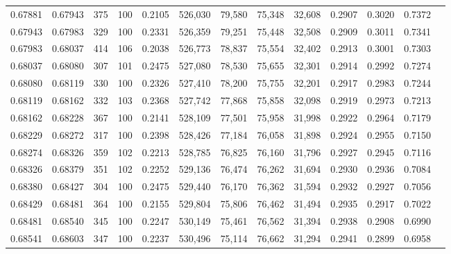 \begin{tabular}{rrrrrrrrrrrrr}
0.67881 & 0.67943 &   375 & 100 &                                     0.2105 & 526,030 &  79,580 &  75,348 &  32,608 & 0.2907 & 0.3020 & 0.7372 \\
0.67943 & 0.67983 &   329 & 100 &                                     0.2331 & 526,359 &  79,251 &  75,448 &  32,508 & 0.2909 & 0.3011 & 0.7341 \\
0.67983 & 0.68037 &   414 & 106 &                                     0.2038 & 526,773 &  78,837 &  75,554 &  32,402 & 0.2913 & 0.3001 & 0.7303 \\
0.68037 & 0.68080 &   307 & 101 &                                     0.2475 & 527,080 &  78,530 &  75,655 &  32,301 & 0.2914 & 0.2992 & 0.7274 \\
0.68080 & 0.68119 &   330 & 100 &                                     0.2326 & 527,410 &  78,200 &  75,755 &  32,201 & 0.2917 & 0.2983 & 0.7244 \\
0.68119 & 0.68162 &   332 & 103 &                                     0.2368 & 527,742 &  77,868 &  75,858 &  32,098 & 0.2919 & 0.2973 & 0.7213 \\
0.68162 & 0.68228 &   367 & 100 &                                     0.2141 & 528,109 &  77,501 &  75,958 &  31,998 & 0.2922 & 0.2964 & 0.7179 \\
0.68229 & 0.68272 &   317 & 100 &                                     0.2398 & 528,426 &  77,184 &  76,058 &  31,898 & 0.2924 & 0.2955 & 0.7150 \\
0.68274 & 0.68326 &   359 & 102 &                                     0.2213 & 528,785 &  76,825 &  76,160 &  31,796 & 0.2927 & 0.2945 & 0.7116 \\
0.68326 & 0.68379 &   351 & 102 &                                     0.2252 & 529,136 &  76,474 &  76,262 &  31,694 & 0.2930 & 0.2936 & 0.7084 \\
0.68380 & 0.68427 &   304 & 100 &                                     0.2475 & 529,440 &  76,170 &  76,362 &  31,594 & 0.2932 & 0.2927 & 0.7056 \\
0.68429 & 0.68481 &   364 & 100 &                                     0.2155 & 529,804 &  75,806 &  76,462 &  31,494 & 0.2935 & 0.2917 & 0.7022 \\
0.68481 & 0.68540 &   345 & 100 &                                     0.2247 & 530,149 &  75,461 &  76,562 &  31,394 & 0.2938 & 0.2908 & 0.6990 \\
0.68541 & 0.68603 &   347 & 100 &                                     0.2237 & 530,496 &  75,114 &  76,662 &  31,294 & 0.2941 & 0.2899 & 0.6958 \\

\end{tabular}
